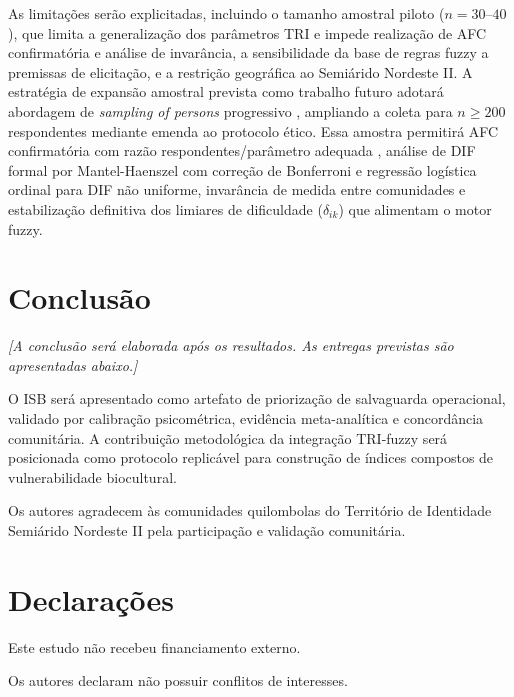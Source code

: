 \documentclass[pdflatex,sn-basic]{sn-jnl}%
\theoremstyle{thmstyleone}%
\theoremstyle{thmstyletwo}%
\theoremstyle{thmstylethree}%
\begin{document}
As limitações serão explicitadas, incluindo o tamanho amostral piloto ($n = 30$--$40$), que limita a generalização dos parâmetros TRI e impede realização de AFC confirmatória e análise de invarância, a sensibilidade da base de regras fuzzy a premissas de elicitação, e a restrição geográfica ao Semiárido Nordeste II. A estratégia de expansão amostral prevista como trabalho futuro adotará abordagem de \textit{sampling of persons} progressivo \cite{Linacre1994}, ampliando a coleta para $n \geq 200$ respondentes mediante emenda ao protocolo ético. Essa amostra permitirá AFC confirmatória com razão respondentes/parâmetro adequada \cite{Brown2015}, análise de DIF formal por Mantel-Haenszel com correção de Bonferroni e regressão logística ordinal para DIF não uniforme, invarância de medida entre comunidades e estabilização definitiva dos limiares de dificuldade ($\delta_{ik}$) que alimentam o motor fuzzy.


\section{Conclusão}\label{sec:conclusao}

\textit{[A conclusão será elaborada após os resultados. As entregas previstas são apresentadas abaixo.]}

O ISB será apresentado como artefato de priorização de salvaguarda operacional, validado por calibração psicométrica, evidência meta-analítica e concordância comunitária. A contribuição metodológica da integração TRI-fuzzy será posicionada como protocolo replicável para construção de índices compostos de vulnerabilidade biocultural.


\backmatter


Os autores agradecem às comunidades quilombolas do Território de Identidade Semiárido Nordeste II pela participação e validação comunitária.

\section*{Declarações}

Este estudo não recebeu financiamento externo.

Os autores declaram não possuir conflitos de interesses.
\end{document}
